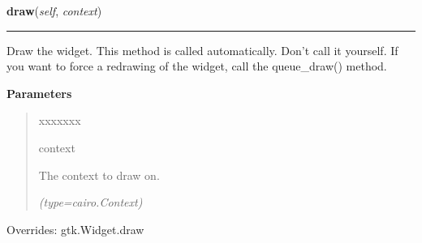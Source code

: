 \hspace{.8\funcindent}\begin{boxedminipage}{\funcwidth}

    \raggedright \textbf{draw}(\textit{self}, \textit{context})

    \vspace{-1.5ex}

    \rule{\textwidth}{0.5\fboxrule}
\setlength{\parskip}{2ex}
    Draw the widget. This method is called automatically. Don't call it 
    yourself. If you want to force a redrawing of the widget, call the 
    queue\_draw() method.

\setlength{\parskip}{1ex}
      \textbf{Parameters}
      \vspace{-1ex}

      \begin{quote}
        \begin{Ventry}{xxxxxxx}

          \item[context]

          The context to draw on.

            {\it (type=cairo.Context)}

        \end{Ventry}

      \end{quote}

      Overrides: gtk.Widget.draw

    \end{boxedminipage}

    \label{pygtk_chart:chart:Chart:export_svg}

    \vspace{0.5ex}

